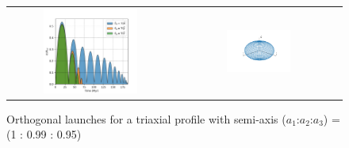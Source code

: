 \documentclass{beamer}
\begin{document}
%

\begin{frame}
	\begin{figure}[h]
		\begin{tabular}{cc}
			\includegraphics[width = 0.6\textwidth]{"../Files/Week 7/orthogonal_triaxial"} &
			\includegraphics[width = 0.4\textwidth]{"../Files/Week 7/ellipsoid"}
		\end{tabular}
		\caption{Orthogonal launches for a triaxial profile with semi-axis ($a_1$:$a_2$:$a_3$) = (1 : 0.99 : 0.95)}
		\label{fig: mainOrthogonalLaunches}
	\end{figure}
\end{frame}
\end{document}
